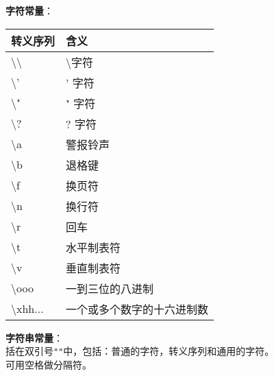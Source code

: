 \documentclass[UTF8]{ctexart}
\begin{document}
	\textbf{字符常量}：
	\begin{tabular*}{\linewidth}{l|l}
		\toprule
		转义序列 & 含义\\
		\midrule
		\textbackslash \textbackslash & \textbackslash 字符 \\
		\textbackslash' & ' 字符 \\
		\textbackslash" & " 字符\\
		\textbackslash ? & ? 字符 \\
		\textbackslash a & 警报铃声 \\
		\textbackslash b & 退格键 \\
		\textbackslash f & 换页符 \\
		\textbackslash n & 换行符 \\
		\textbackslash r & 回车 \\
		\textbackslash t & 水平制表符 \\
		\textbackslash v & 垂直制表符 \\
		\textbackslash ooo & 一到三位的八进制 \\
		\textbackslash xhh... & 一个或多个数字的十六进制数\\
		\bottomrule
	\end{tabular*}

	\textbf{字符串常量}：\\括在双引号\verb|""|中，包括：普通的字符，转义序列和通用的字符。\\可用空格做分隔符。
	
\end{document}
